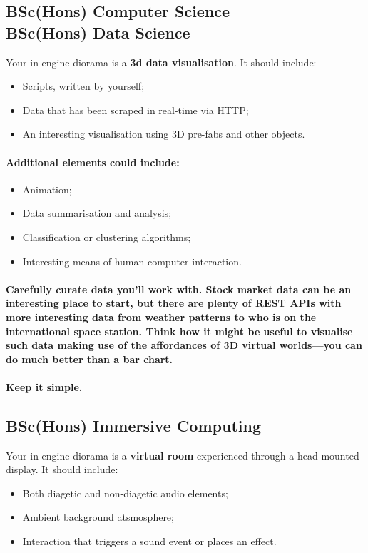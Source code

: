 \documentclass{../../fal_assignment}
\begin{document}
\subsection*{BSc(Hons) Computer Science \\ BSc(Hons) Data Science}

Your in-engine diorama is a \textbf{3d data visualisation}. It should include:
\begin{itemize}
\item Scripts, written by yourself;
\item Data that has been scraped in real-time via HTTP; 
\item An interesting visualisation using 3D pre-fabs and other objects.
\end{itemize}
\paragraph{Additional elements could include:}
\begin{itemize}
\item Animation;
\item Data summarisation and analysis;
\item Classification or clustering algorithms;
\item Interesting means of human-computer interaction. 
\end{itemize}
\paragraph{Carefully curate data you'll work with. Stock market data can be an interesting place to start, but there are plenty of REST APIs with more interesting data from weather patterns to who is on the international space station. Think how it might be useful to visualise such data making use of the affordances of 3D virtual worlds---you can do much better than a bar chart.}

\paragraph{Keep it simple.}

\subsection*{BSc(Hons) Immersive Computing}

Your in-engine diorama is a \textbf{virtual room} experienced through a head-mounted display. It should include:
\begin{itemize}
\item Both diagetic and non-diagetic audio elements;
\item Ambient background atsmosphere; 
\item Interaction that triggers a sound event or places an effect.
\end{itemize}
\end{document}
